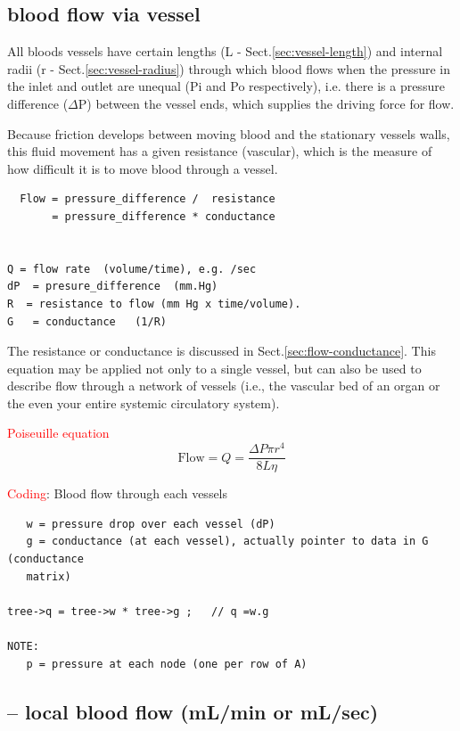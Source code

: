 \subsection{blood flow via vessel}
\label{sec:blood-flow}

All bloods vessels have certain lengths (L - Sect.\ref{sec:vessel-length}) and
internal radii (r - Sect.\ref{sec:vessel-radius}) through which blood flows when
the pressure in the inlet and outlet are unequal (Pi and Po respectively), i.e.
there is a pressure difference ($\Delta$P) between the vessel ends, which
supplies the driving force for flow.

Because friction develops between moving blood and the stationary vessels walls,
this fluid movement has a given resistance (vascular), which is the measure of
how difficult it is to move blood through a vessel.

\begin{verbatim}
  Flow = pressure_difference /  resistance 
       = pressure_difference * conductance


Q = flow rate  (volume/time), e.g. /sec
dP  = presure_difference  (mm.Hg)
R  = resistance to flow (mm Hg x time/volume).
G   = conductance   (1/R)
\end{verbatim}
The resistance or conductance is discussed in Sect.\ref{sec:flow-conductance}.
This equation may be applied not only to a single vessel, but can also be used
to describe flow through a network of vessels (i.e., the vascular bed of an
organ or the even your entire systemic circulatory system).  

\textcolor{red}{Poiseuille equation}
\begin{equation}
\text{Flow} = Q = \frac{\Delta P \pi r^4}{8 L \eta}
\end{equation}


\textcolor{red}{Coding}: Blood flow through each vessels
\begin{verbatim}
   w = pressure drop over each vessel (dP)
   g = conductance (at each vessel), actually pointer to data in G (conductance
   matrix)

tree->q = tree->w * tree->g ;   // q =w.g

NOTE:
   p = pressure at each node (one per row of A)
\end{verbatim}


\subsection{-- local blood flow (mL/min or mL/sec)}


